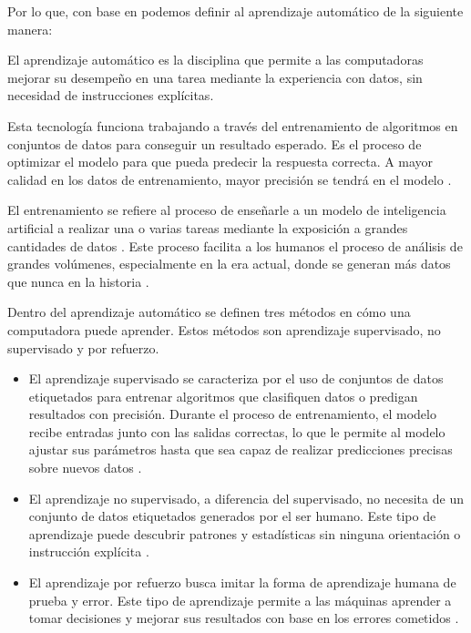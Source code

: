 Por lo que, con base en \cite{Oracle2025, IBM2025} podemos definir al aprendizaje automático de la siguiente manera:

\begin{definition}
	
	El aprendizaje automático es la disciplina que permite a las computadoras mejorar su desempeño en una tarea mediante la experiencia con datos, sin necesidad de instrucciones explícitas.
	
\end{definition}

Esta tecnología funciona trabajando a través del entrenamiento de algoritmos en conjuntos de datos para conseguir un resultado esperado. Es el proceso de optimizar el modelo para que pueda predecir la respuesta correcta. A mayor calidad en los datos de entrenamiento, mayor precisión se tendrá en el modelo \cite{GoogleCloud2025}.

El entrenamiento se refiere al proceso de enseñarle a un modelo de inteligencia artificial a realizar una o varias tareas mediante la exposición a grandes cantidades de datos \cite{training}. Este proceso facilita a los humanos el proceso de análisis de grandes volúmenes, especialmente en la era actual, donde se generan más datos que nunca en la historia \cite{oracle_ia}.

Dentro del aprendizaje automático se definen tres métodos en cómo una computadora puede aprender. Estos métodos son aprendizaje supervisado, no supervisado y por refuerzo.

\begin{itemize}
	
	\item El aprendizaje supervisado se caracteriza por el uso de conjuntos de datos etiquetados para entrenar algoritmos que clasifiquen datos o predigan resultados con precisión. Durante el proceso de entrenamiento, el modelo recibe entradas junto con las salidas correctas, lo que le permite al modelo ajustar sus parámetros hasta que sea capaz de realizar predicciones precisas sobre nuevos datos \cite{IBM2025}. 
	
	
	
	\item El aprendizaje no supervisado, a diferencia del supervisado, no necesita de un conjunto de datos etiquetados generados por el ser humano. Este tipo de aprendizaje puede descubrir patrones y estadísticas sin ninguna orientación o instrucción explícita \cite{GoogleCloud}. 
	
	
	
	\item El aprendizaje por refuerzo busca imitar la forma de aprendizaje humana de prueba y error. Este tipo de aprendizaje permite a las máquinas aprender a tomar decisiones y mejorar sus resultados con base en los errores cometidos \cite{AWS}.
	
	
	
\end{itemize}


